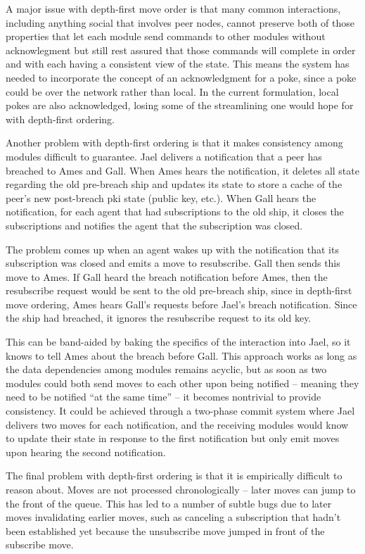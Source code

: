 \documentclass[twoside]{article}
\begin{document}
A major issue with depth-first move order is that many common interactions, including anything social that involves peer nodes, cannot preserve both of those properties that let each module send commands to other modules without acknowlegment but still rest assured that those commands will complete in order and with each having a consistent view of the state.  This means the system has needed to incorporate the concept of an acknowledgment for a poke, since a poke could be over the network rather than local.  In the current formulation, local pokes are also acknowledged, losing some of the streamlining one would hope for with depth-first ordering.

Another problem with depth-first ordering is that it makes consistency among modules difficult to guarantee.  Jael delivers a notification that a peer has breached to Ames and Gall.  When Ames hears the notification, it deletes all state regarding the old pre-breach ship and updates its state to store a cache of the peer's new post-breach {\sc pki} state (public key, etc.).  When Gall hears the notification, for each agent that had subscriptions to the old ship, it closes the subscriptions and notifies the agent that the subscription was closed.

The problem comes up when an agent wakes up with the notification that its subscription was closed and emits a move to resubscribe.  Gall then sends this move to Ames.  If Gall heard the breach notification before Ames, then the resubscribe request would be sent to the old pre-breach ship, since in depth-first move ordering, Ames hears Gall's requests before Jael's breach notification.  Since the ship had breached, it ignores the resubscribe request to its old key.

This can be band-aided by baking the specifics of the interaction into Jael, so it knows to tell Ames about the breach before Gall.  This approach works as long as the data dependencies among modules remains acyclic, but as soon as two modules could both send moves to each other upon being notified – meaning they need to be notified ``at the same time'' – it becomes nontrivial to provide consistency.  It could be achieved through a two-phase commit system where Jael delivers two moves for each notification, and the receiving modules would know to update their state in response to the first notification but only emit moves upon hearing the second notification.

The final problem with depth-first ordering is that it is empirically difficult to reason about.  Moves are not processed chronologically – later moves can jump to the front of the queue.  This has led to a number of subtle bugs due to later moves invalidating earlier moves, such as canceling a subscription that hadn't been established yet because the unsubscribe move jumped in front of the subscribe move.
\end{document}
